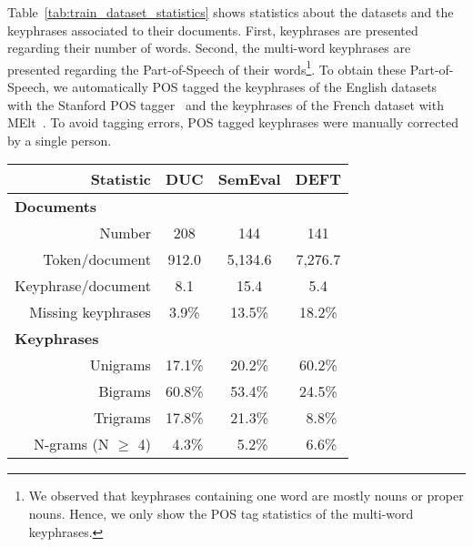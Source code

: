     Table~\ref{tab:train_dataset_statistics} shows statistics about the datasets
    and the keyphrases associated to their documents. First, keyphrases are presented
    regarding their number of words. Second, the multi-word keyphrases are
    presented regarding the Part-of-Speech of their words\footnote{We observed
    that keyphrases containing one word are mostly nouns or proper nouns. Hence,
    we only show the POS tag statistics of the multi-word keyphrases.}. To
    obtain these Part-of-Speech, we automatically POS tagged the keyphrases of
    the English datasets with the Stanford POS
    tagger~\cite{toutanova2003stanfordpostagger} and the keyphrases of the
    French dataset with MElt~\cite{denis2009melt}. To avoid tagging errors, POS
    tagged keyphrases were manually corrected by a single person. 
    \begin{table}
      \centering
      \begin{tabular}{lr|ccc}
        \toprule
        & \textbf{Statistic} & \textbf{DUC} & \textbf{SemEval} & \textbf{DEFT}\\
        \hline
        \multicolumn{2}{l|}{\textbf{Documents}}\\
        \multicolumn{2}{r|}{Number} & 208 & 144 & 141\\
        \multicolumn{2}{r|}{Token/document} & 912.0 & 5,134.6 & 7,276.7\\
        \multicolumn{2}{r|}{Keyphrase/document} & 8.1 & 15.4 & 5.4\\
        \multicolumn{2}{r|}{Missing keyphrases} & 3.9\% & 13.5\% & 18.2\%\\
        \hline
        \multicolumn{2}{l|}{\textbf{Keyphrases}}\\
        \multicolumn{2}{r|}{Unigrams} & 17.1\% & 20.2\% & 60.2\%\\
        \multicolumn{2}{r|}{Bigrams} & 60.8\% & 53.4\% & 24.5\%\\
        \multicolumn{2}{r|}{Trigrams} & 17.8\% & 21.3\% & $~~$8.8\%\\
        \multicolumn{2}{r|}{N-grams (N $\geq$ 4)} & $~~$4.3\% & $~~$5.2\% & $~~$6.6\%\\

\end{tabular}
\end{table}
